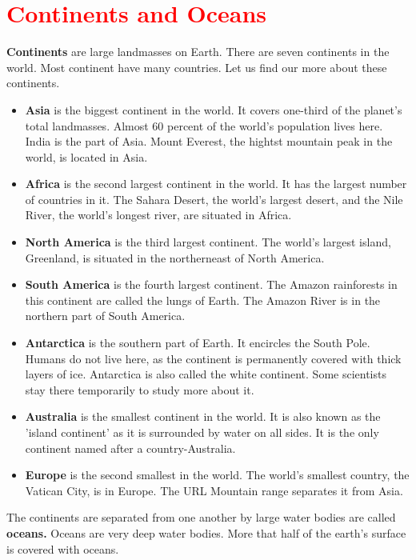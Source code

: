 \section{\textcolor{red}{Continents and Oceans}}
\textbf{Continents} are large landmasses on Earth. There are seven continents in the world. Most continent have many countries. Let us find our more about these continents.
\begin{itemize}
    \item \textbf{Asia} is the biggest continent in the world. It covers one-third of the planet’s total landmasses. Almost 60 percent of the world's population lives here. India is the part of Asia. Mount Everest, the hightst mountain peak in the world, is located in Asia.
    \item \textbf{Africa} is the second largest continent in the world. It has the largest number of countries in it. The Sahara Desert, the world's largest desert, and the Nile River, the world's longest river, are situated in Africa.
    \item \textbf{North America} is the third largest continent. The world's largest island, Greenland, is situated in the northerneast of North America.
    \item \textbf{South America} is the fourth largest continent. The Amazon rainforests in this continent are called the lungs of Earth. The Amazon River is in the northern part of South America.
    \item \textbf{Antarctica} is the southern part of Earth. It encircles the South Pole. Humans do not live here, as the continent is permanently covered with thick layers of ice. Antarctica is also called the white continent. Some scientists stay there temporarily to study more about it.
    \item \textbf{Australia} is the smallest continent in the world. It is also known as the 'island continent' as it is surrounded by water on all sides. It is the only continent named after a country-Australia.
    \item \textbf{Europe} is the second smallest in the world. The world's smallest country, the Vatican City, is in Europe. The URL Mountain range separates it from Asia.
\end{itemize}
The continents are separated from one another by large water bodies are called \textbf{oceans.} Oceans are very deep water bodies. More that half of the earth's surface is covered with oceans.
\vspace{0.1in}
\par
